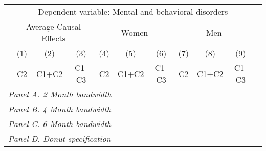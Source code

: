 {\def\sym#1{\ifmmode^{#1}\else\(^{#1}\)\fi} \begin{tabular}{l*{10}{c}} \toprule & \multicolumn{9}{c}{Dependent variable: Mental and behavioral disorders} \\ \cmidrule(lr){2-10}
            &\multicolumn{3}{c}{Average Causal Effects}&\multicolumn{3}{c}{Women}             &\multicolumn{3}{c}{Men}               \\\cmidrule(lr){2-4}\cmidrule(lr){5-7}\cmidrule(lr){8-10}
            &\multicolumn{1}{c}{(1)}&\multicolumn{1}{c}{(2)}&\multicolumn{1}{c}{(3)}&\multicolumn{1}{c}{(4)}&\multicolumn{1}{c}{(5)}&\multicolumn{1}{c}{(6)}&\multicolumn{1}{c}{(7)}&\multicolumn{1}{c}{(8)}&\multicolumn{1}{c}{(9)}\\
            &\multicolumn{1}{c}{C2}&\multicolumn{1}{c}{C1+C2}&\multicolumn{1}{c}{C1-C3}&\multicolumn{1}{c}{C2}&\multicolumn{1}{c}{C1+C2}&\multicolumn{1}{c}{C1-C3}&\multicolumn{1}{c}{C2}&\multicolumn{1}{c}{C1+C2}&\multicolumn{1}{c}{C1-C3}\\
\midrule
 \multicolumn{10}{l}{\emph{Panel A. 2 Month bandwidth}} \\    \midrule\multicolumn{10}{l}{\emph{Panel B. 4 Month bandwidth}} \\    \midrule\multicolumn{10}{l}{\emph{Panel C. 6 Month bandwidth}} \\    \midrule\multicolumn{10}{l}{\emph{Panel D. Donut specification}} \\    
\bottomrule \end{tabular} } 
